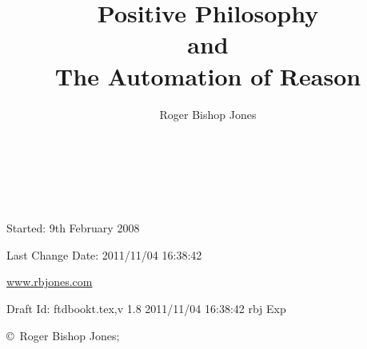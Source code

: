\documentclass[10pt,titlepage]{book}
\author{Roger Bishop Jones}
\title{Positive Philosophy\\ and\\ The Automation of Reason}
\date{\ }
\begin{document}
\frontmatter

\begin{titlepage}
\maketitle

\ 
\\

\vfill

\begin{centering}

{\footnotesize

Started: 9th February 2008

Last Change $ $Date: 2011/11/04 16:38:42 $ $

\href{http://www.rbjones.com/}{www.rbjones.com}

Draft $ $Id: ftdbookt.tex,v 1.8 2011/11/04 16:38:42 rbj Exp $ $

\copyright\ Roger Bishop Jones;

}%

\end{centering}

\thispagestyle{empty}
\end{titlepage}

{\parskip=0pt\tableofcontents}
\end{document}
